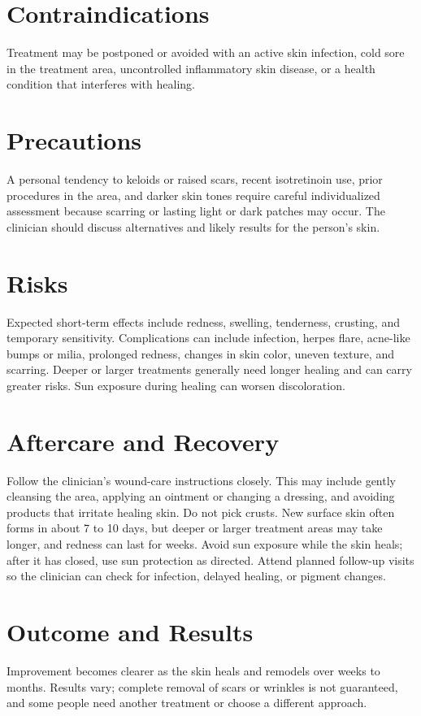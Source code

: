 \section*{Contraindications}
Treatment may be postponed or avoided with an active skin infection, cold sore in the treatment area, uncontrolled inflammatory skin disease, or a health condition that interferes with healing.

\section*{Precautions}
A personal tendency to keloids or raised scars, recent isotretinoin use, prior procedures in the area, and darker skin tones require careful individualized assessment because scarring or lasting light or dark patches may occur. The clinician should discuss alternatives and likely results for the person's skin.

\section*{Risks}
Expected short-term effects include redness, swelling, tenderness, crusting, and temporary sensitivity. Complications can include infection, herpes flare, acne-like bumps or milia, prolonged redness, changes in skin color, uneven texture, and scarring. Deeper or larger treatments generally need longer healing and can carry greater risks. Sun exposure during healing can worsen discoloration.

\section*{Aftercare and Recovery}
Follow the clinician's wound-care instructions closely. This may include gently cleansing the area, applying an ointment or changing a dressing, and avoiding products that irritate healing skin. Do not pick crusts. New surface skin often forms in about 7 to 10 days, but deeper or larger treatment areas may take longer, and redness can last for weeks. Avoid sun exposure while the skin heals; after it has closed, use sun protection as directed. Attend planned follow-up visits so the clinician can check for infection, delayed healing, or pigment changes.

\section*{Outcome and Results}
Improvement becomes clearer as the skin heals and remodels over weeks to months. Results vary; complete removal of scars or wrinkles is not guaranteed, and some people need another treatment or choose a different approach.

